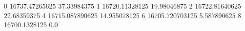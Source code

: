 0 16737.47265625 37.33984375
1 16720.11328125 19.98046875
2 16722.81640625 22.68359375
4 16715.087890625 14.955078125
6 16705.720703125 5.587890625
8 16700.1328125 0.0
